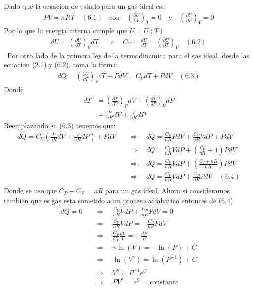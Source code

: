 \documentclass[a4paper]{article}
\begin{document}
    \begin{answer}[Punto 6]
        Dado que la ecuacion de estado para un gas ideal es:
        \begin{align*}
            PV = nRT \quad (6.1) \quad \text{con}  \quad \left(\frac{\partial U}{\partial V}\right)_T = 0 \quad \text{y} \quad \left(\frac{\partial U}{\partial P}\right)_V = 0
        \end{align*}
        Por lo que la energia interna cumple que $U = U(T)$
        \begin{align*}
            dU = \left(\frac{\partial U}{\partial T}\right)_V dT   \quad \Rightarrow \quad C_V =  \frac{dU}{dT}= \left(\frac{\partial U}{\partial T}\right)_V \quad (6.2)
        \end{align*}\
        Por otro lado de la primera ley de la termodinamica para el gas ideal, desde las ecuacion (2.1) y (6.2), toma la forma:
        \begin{align*}
            dQ = \left(\frac{\partial U}{\partial T}\right)_V dT + PdV  = C_VdT + PdV \quad (6.3)
        \end{align*}
        Donde 
        \begin{align*}
            dT &= \left(\frac{\partial T}{\partial V}\right)_P dV + \left(\frac{\partial T}{\partial P}\right)_V dP\\
            &= \frac{P}{nR}dV + \frac{V}{nR}dP \quad 
        \end{align*}
        Reemplazando en (6.3) tenemos que:
        \begin{align*}
            dQ = C_V \left( \frac{P}{nR}dV + \frac{V}{nR}dP \right) + PdV \quad &\Rightarrow \quad dQ = \frac{C_V}{nR}PdV + \frac{C_V}{nR}VdP + PdV\\
            &\Rightarrow \quad dQ = \frac{C_V}{nR}VdP + \left( \frac{C_V}{nR} + 1 \right)PdV\\
            &\Rightarrow \quad dQ =  \frac{C_V}{nR}VdP + \left( \frac{C_V + nR}{nR}\right)PdV\\
            &\Rightarrow \quad dQ =  \frac{C_V}{nR}VdP +  \frac{C_P}{nR} PdV \quad (6.4)\\
        \end{align*}
        Donde se uso que $C_P - C_V = nR$ para un gas ideal.
        Ahora si consideramos tambien que es gas esta sometido a un proceso adiabatico entonces de (6.4)
        \begin{align*}
            dQ = 0 \quad &\Rightarrow \quad \frac{C_V}{nR}VdP +  \frac{C_P}{nR} PdV = 0\\
            &\Rightarrow \quad \frac{C_V}{nR}VdP = - \frac{C_P}{nR} PdV\\
            &\Rightarrow \quad \frac{C_P}{C_V}\frac{dV}{V} = -\frac{dP}{P}\\
            &\Rightarrow \quad \gamma \ln(V) = -\ln(P) + C\\
            &\Rightarrow \quad \ln(V^\gamma) = \ln(P^{-1}) + C\\
            &\Rightarrow \quad V^\gamma = P^{-1}e^C\\
            &\Rightarrow \quad PV^\gamma = e^C = \text{constante}\\
        \end{align*}


\end{answer}
\end{document}
